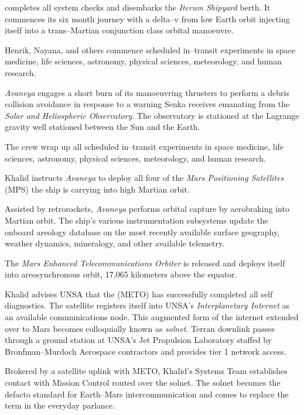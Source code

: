  completes all system checks and disembarks the {\it Iterum Shipyard} berth. It commences its six month journey with a delta--v from low Earth orbit injecting itself into a trans--Martian conjunction class orbital manoeuvre.
\StopTimelineDate

Henrik, Nayana, and others commence scheduled in--transit experiments in space medicine, life sciences, astronomy, physical sciences, meteorology, and human research.
\StopTimelineDate

{\it Avaneya} engages a short burn of its manoeuvring thrusters to perform a debris collision avoidance in response to a warning Senka receives emanating from the {\it Solar and Heliospheric Observatory}. The observatory is stationed at the Lagrange  gravity well stationed between the Sun and the Earth.
\StopTimelineDate

The crew wrap up all scheduled in--transit experiments in space medicine, life sciences, astronomy, physical sciences, meteorology, and human research.
\StopTimelineDate

Khalid instructs {\it Avaneya} to deploy all four of the {\it Mars Positioning Satellites} (MPS) the ship is carrying into high Martian orbit.
\StopTimelineDate

Assisted by retrorockets, {\it Avaneya} performs orbital capture by aerobraking into Martian orbit. The ship's various instrumentation subsystems update the onboard areology database on the most recently available surface geography, weather dynamics, mineralogy, and other available telemetry.

The {\it Mars Enhanced Telecommunications Orbiter} is released and deploys itself into areosynchronous orbit, 17,065 kilometers above the equator.
\StopTimelineDate

Khalid advises UNSA that the  (METO) has successfully completed all self diagnostics. The satellite registers itself into UNSA's {\it Interplanetary Internet} as an available communications node. This augmented form of the internet extended over to Mars becomes colloquially known as {\it solnet}. Terran downlink passes through a ground station at UNSA's Jet Propulsion Laboratory staffed by Bronfman--Murdoch Aerospace contractors and provides tier 1 network access.

Brokered by a satellite uplink with METO, Khalid's Systems Team establishes contact with Mission Control routed over the solnet. The solnet becomes the defacto standard for Earth--Mars intercommunication and comes to replace the term  in the everyday parlance.
\StopTimelineDate

